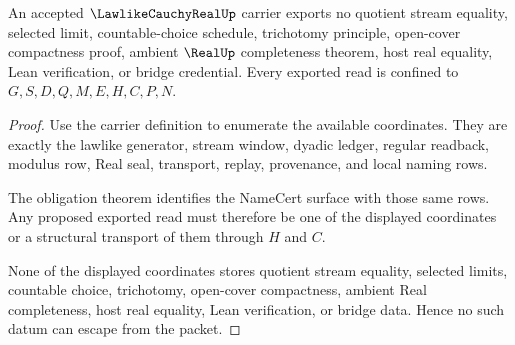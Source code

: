 \begin{theorem}
\label{thm:lawlike-cauchy-real-nonescape}
An accepted $\LawlikeCauchyRealUp$ carrier exports no quotient stream equality, selected limit, countable-choice schedule, trichotomy principle, open-cover compactness proof, ambient $\RealUp$ completeness theorem, host real equality, Lean verification, or bridge credential. Every exported read is confined to $G,S,D,Q,M,E,H,C,P,N$.
\end{theorem}
\begin{proof}
Use the carrier definition to enumerate the available coordinates. They are exactly the lawlike generator, stream window, dyadic ledger, regular readback, modulus row, Real seal, transport, replay, provenance, and local naming rows.

The obligation theorem identifies the NameCert surface with those same rows. Any proposed exported read must therefore be one of the displayed coordinates or a structural transport of them through $H$ and $C$.

None of the displayed coordinates stores quotient stream equality, selected limits, countable choice, trichotomy, open-cover compactness, ambient Real completeness, host real equality, Lean verification, or bridge data. Hence no such datum can escape from the packet.
\end{proof}


\begin{closurestatus}{\LawlikeCauchyRealUp}
  \theoryclosure{\seedClosure}
  \formalstatus{\unformalizedV}
\end{closurestatus}
